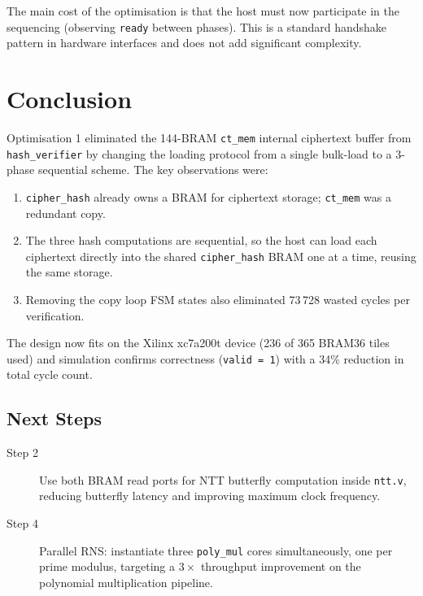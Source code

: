 \documentclass[12pt, a4paper]{article}
\begin{document}
The main cost of the optimisation is that the host must now participate
in the sequencing (observing \texttt{ready} between phases). This is a
standard handshake pattern in hardware interfaces and does not add
significant complexity.

\section{Conclusion}
\label{sec:conclusion}

Optimisation 1 eliminated the 144-BRAM \texttt{ct\_mem} internal
ciphertext buffer from \texttt{hash\_verifier} by changing the loading
protocol from a single bulk-load to a 3-phase sequential scheme. The
key observations were:

\begin{enumerate}
  \item \texttt{cipher\_hash} already owns a BRAM for ciphertext
        storage; \texttt{ct\_mem} was a redundant copy.
  \item The three hash computations are sequential, so the host can
        load each ciphertext directly into the shared \texttt{cipher\_hash}
        BRAM one at a time, reusing the same storage.
  \item Removing the copy loop FSM states also eliminated 73\,728
        wasted cycles per verification.
\end{enumerate}

The design now fits on the Xilinx xc7a200t device (236 of 365
BRAM36 tiles used) and simulation confirms correctness
(\texttt{valid = 1}) with a 34\% reduction in total cycle count.

\subsection*{Next Steps}

\begin{description}
  \item[Step 2] Use both BRAM read ports for NTT butterfly computation
        inside \texttt{ntt.v}, reducing butterfly latency and improving
        maximum clock frequency.
  \item[Step 4] Parallel RNS: instantiate three \texttt{poly\_mul}
        cores simultaneously, one per prime modulus, targeting a
        $3\times$ throughput improvement on the polynomial
        multiplication pipeline.
\end{description}
\end{document}
